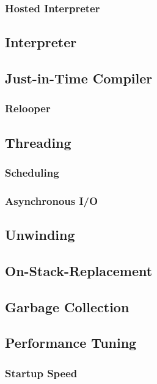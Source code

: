 \documentclass{acm_proc_article-sp}
\begin{document}
\subsubsection{Hosted Interpreter}

\subsection{Interpreter}

\subsection{Just-in-Time Compiler}

\subsubsection{Relooper}

\subsection{Threading}

\subsubsection{Scheduling}

\subsubsection{Asynchronous I/O}

\subsection{Unwinding}

\subsection{On-Stack-Replacement}

\subsection{Garbage Collection}

\subsection{Performance Tuning}

\subsubsection{Startup Speed}
\end{document}
